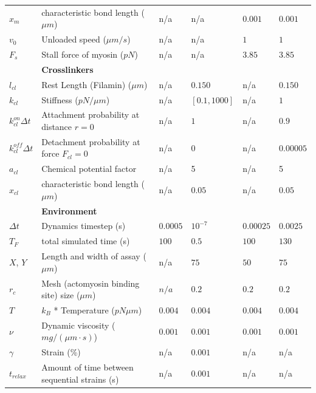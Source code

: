 \documentclass[12pt]{article}
\begin{document}
\begin{table}
\begin{tabular}{|C{1.5cm}|L{7cm}|C{1.5cm}|C{1.5cm}|C{2cm}|C{1.5cm}|}
    $x_m$ & characteristic bond length ($\mu m$) \cite{stam2015}& n/a & n/a & $0.001$ & $0.001$\\
    $v_0$ & Unloaded speed ($\mu m/s$) \cite{kron1986}&  n/a & n/a & $1$ & $1$\\
    $F_s$ & Stall force of myosin ($pN$)\cite{veigel2003}& n/a & n/a & $3.85$ & $3.85$\\
    \hline
    &\bf{Crosslinkers} & & & &\\
    \hline
    $l_{cl}$& Rest Length (Filamin) ($\mu m$)\cite{ferrer2008} & n/a &$0.150$ &n/a & $0.150$\\
    $k_{cl}$ & Stiffness ($pN/\mu m$)& n/a & $[0.1,1000]$ & n/a & $1$ \\
    $k^{on}_{cl}\Delta t$ & Attachment probability at distance $r=0$ & n/a & $1$ & n/a & $0.9$ \\
    $k^{off}_{cl}\Delta t$ & Detachment probability at force $F_{cl}=0$& n/a & $0$ & n/a & $0.00005$ \\
    $a_{cl}$ & Chemical potential factor& n/a & 5 &n/a & 5\\
    $x_{cl}$& characteristic bond length ($\mu m$) & n/a & $0.05$ & n/a & $0.05$ \\
    \hline
    &\bf{Environment} & & & &\\
    \hline
    $\Delta t$ & Dynamics timestep (s) & $0.0005$ & $10^{-7}$ & $0.00025$ & $0.0025$\\
    $T_F$& total simulated time (s) & $100$ & $0.5$ & $100$ & $130$\\
    $X$, $Y$ & Length and width of assay ($\mu m$)& n/a & $75$ & $50$ & $75$\\
    $r_c$ & Mesh (actomyosin binding site) size ($\mu m$) & $n/a$ & $0.2 $ & $0.2 $ & $0.2$\\
    $T$ & $k_B$ * Temperature ($pN\mu m$)& $0.004$ & $0.004$& $0.004$ & $0.004$\\
    $\nu$ & Dynamic viscosity ($mg/(\mu m \cdot s)$) & $0.001$& $0.001$& $0.001$ & $0.001$ \\
    $\gamma$ & Strain (\%) \cite{stricker2010}& n/a& $0.001$&n/a &n/a\\
    $t_{relax}$ & Amount of time between sequential strains (s)& n/a& $0.001$ &n/a & n/a \\
    \hline
  \end{tabular}
  \label{tab:params}
\end{table}
\end{document}
